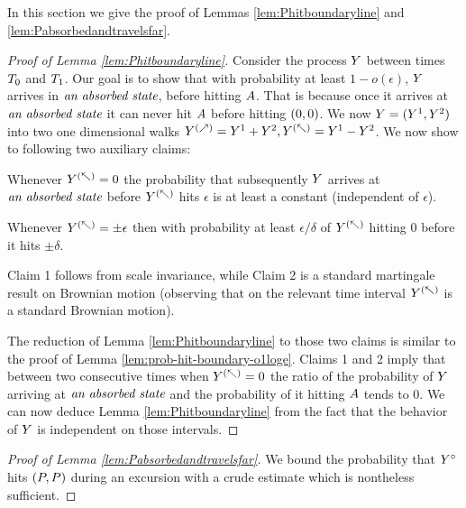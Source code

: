 {In this section we give the proof of Lemmas \ref{lem:Phitboundaryline} 
and \ref{lem:Pabsorbedandtravelsfar}. 

\newcommand{\tdh}{\twodim^{(\nearrow)}}
\newcommand{\tdv}{\twodim^{(\nwarrow)}}

\begin{proof}[Proof of Lemma \ref{lem:Phitboundaryline}]
Consider the process $Y$ between times $T_0$ and $T_1$.
Our goal is to show that with probability at least $1-o(\epsilon)$, $Y$ arrives in
$\emph{\text{an absorbed state}}$, before hitting $A$. That is because once it arrives at
$\emph{\text{an absorbed state}}$ it can never hit $A$ before hitting $(0,0)$.
We now  $Y=(Y^1,Y^2)$ into two one dimensional walks $\tdh=\twodim^1+\twodim^2,\tdv=\twodim^1-\twodim^2$. We now show to following two
auxiliary claims:

\begin{claim}
 Whenever $\tdv=0$ the probability that subsequently $Y$ arrives at $\emph{\text{an absorbed state}}$ before $\tdv$ hits $\epsilon$ is at least a constant (independent of $\epsilon$).
\end{claim}

\begin{claim}
Whenever $\tdv=\pm\epsilon$ then with probability at least $\epsilon/\delta$ of $\tdv$ hitting $0$ before it hits $\pm\delta$.
\end{claim}

Claim 1 follows from scale invariance, while Claim 2 is a standard martingale result on Brownian motion (observing that on the relevant time interval $\tdv$ is a standard Brownian motion).

The reduction of Lemma \ref{lem:Phitboundaryline} to those two claims is similar to the
proof of Lemma \ref{lem:prob-hit-boundary-o1loge}. Claims 1 and 2 imply that between two consecutive times when $\tdv=0$
the ratio of the probability of $Y$ arriving at $\emph{\text{an absorbed state}}$ and the probability
of it hitting $A$ tends to $0$. We can now deduce Lemma \ref{lem:Phitboundaryline} from the fact that the behavior of $Y$ is independent on those intervals.
\end{proof}

\begin{proof}[Proof of Lemma \ref{lem:Pabsorbedandtravelsfar}]
We bound the probability that $Y^\circ$ hits $(P,P)$ during an
excursion with a crude estimate which is nontheless sufficient.


\end{proof}}
